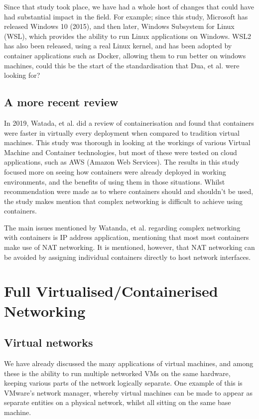 Since that study took place, we have had a whole host of changes that could have had substantial impact in the field. For example; since this study, Microsoft has released Windows 10 (2015)\citep{WindowsIntro}, and then later, Windows Subsystem for Linux (WSL), which provides the ability to run Linux applications on Windows\citep{wslrelease}. WSL2 has also been released, using a real Linux kernel\citep{wslkernel}, and has been adopted by container applications such as Docker\citep{Dockerwsl}, allowing them to run better on windows machines, could this be the start of the standardisation that Dua, et al. were looking for?

\subsection{A more recent review}
In 2019, Watada, et al. did a review of containerisation and found that containers were faster in virtually every deployment when compared to tradition virtual machines\citep{watanda19}. This study was thorough in looking at the workings of various Virtual Machine and Container technologies, but most of these were tested on cloud applications, such as AWS (Amazon Web Services). The results in this study focused more on seeing how containers were already deployed in working environments\citep[VII.]{watanda19}, and the benefits of using them in those situations. Whilst recommendation were made as to where containers should and shouldn't be used, the study makes mention that complex networking is difficult to achieve using containers\citep[VIII. A.]{watanda19}.

The main issues mentioned by Watanda, et al. regarding complex networking with containers is IP address application, mentioning that most most containers make use of NAT networking\citep[VIII. A.]{watanda19}. It is mentioned, however, that NAT networking can be avoided by assigning individual containers directly to host network interfaces\citep[VIII. A.]{watanda19}.

\section{Full Virtualised/Containerised Networking}
\subsection{Virtual networks}
We have already discussed the many applications of virtual machines, and among these is the ability to run multiple networked VMs on the same hardware, keeping various parts of the network logically separate. One example of this is VMware's network manager, whereby virtual machines can be made to appear as separate entities on a physical network\citep{VMwareNetChange}, whilst all sitting on the same base machine.

